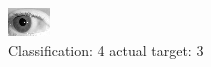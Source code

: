\begin{figure}[h!]
\begin{center}
\includegraphics[width=0.60\columnwidth]{figures/ID206_class_4_target_3.png}
\end{center}
\caption{ Classification: 4 actual target: 3}
\label{fig:ID206_class_4_target_3}
\end{figure}
